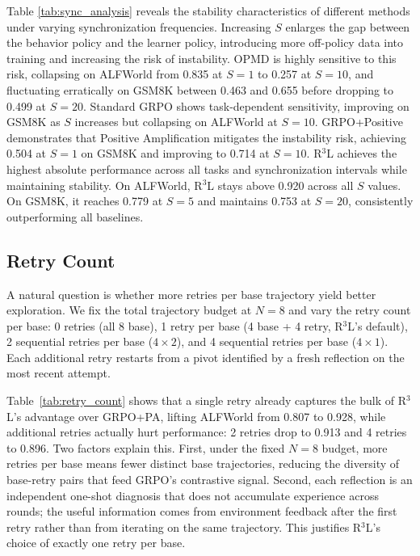 \documentclass{article} %
\theoremstyle{definition}
\theoremstyle{remark}
\begin{document}


Table \ref{tab:sync_analysis} reveals the stability characteristics of different methods under varying synchronization frequencies. Increasing $S$ enlarges the gap between the behavior policy and the learner policy, introducing more off-policy data into training and increasing the risk of instability. OPMD is highly sensitive to this risk, collapsing on ALFWorld from 0.835 at $S=1$ to 0.257 at $S=10$, and fluctuating erratically on GSM8K between 0.463 and 0.655 before dropping to 0.499 at $S=20$. Standard GRPO shows task-dependent sensitivity, improving on GSM8K as $S$ increases but collapsing on ALFWorld at $S=10$. GRPO+Positive demonstrates that Positive Amplification mitigates the instability risk, achieving 0.504 at $S=1$ on GSM8K and improving to 0.714 at $S=10$. R$^3$L achieves the highest absolute performance across all tasks and synchronization intervals while maintaining stability. On ALFWorld, R$^3$L stays above 0.920 across all $S$ values. On GSM8K, it reaches 0.779 at $S=5$ and maintains 0.753 at $S=20$, consistently outperforming all baselines.

\subsection{Retry Count}
\label{sec:retry_count}

A natural question is whether more retries per base trajectory yield better exploration. We fix the total trajectory budget at $N=8$ and vary the retry count per base: 0 retries (all 8 base), 1 retry per base (4 base + 4 retry, R$^3$L's default), 2 sequential retries per base ($4 \times 2$), and 4 sequential retries per base ($4 \times 1$). Each additional retry restarts from a pivot identified by a fresh reflection on the most recent attempt.



Table~\ref{tab:retry_count} shows that a single retry already captures the bulk of R$^3$L's advantage over GRPO+PA, lifting ALFWorld from 0.807 to 0.928, while additional retries actually hurt performance: 2 retries drop to 0.913 and 4 retries to 0.896. Two factors explain this. First, under the fixed $N=8$ budget, more retries per base means fewer distinct base trajectories, reducing the diversity of base-retry pairs that feed GRPO's contrastive signal. Second, each reflection is an independent one-shot diagnosis that does not accumulate experience across rounds; the useful information comes from environment feedback after the first retry rather than from iterating on the same trajectory. This justifies R$^3$L's choice of exactly one retry per base.
\end{document}
